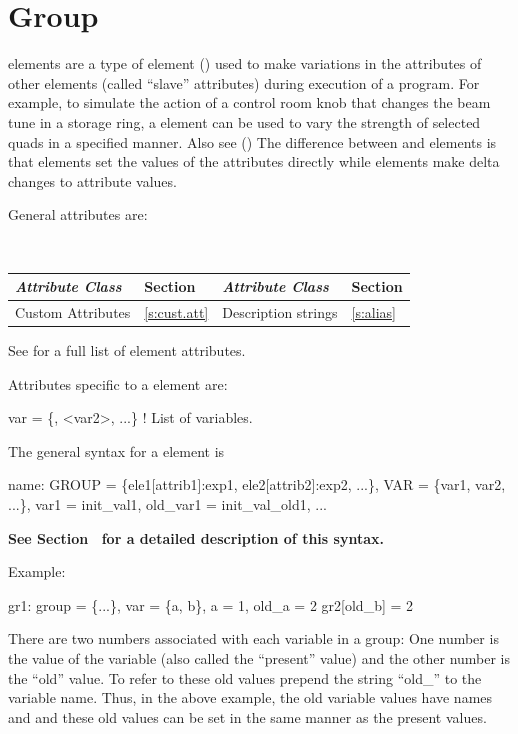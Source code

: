 \section{Group}
\label{s:group}

 elements are a type of  element
() used to make variations in the attributes of
other elements (called ``slave'' attributes) during execution of a
program. For example, to simulate the action of a control room knob
that changes the beam tune in a storage ring, a  element can
be used to vary the strength of selected quads in a specified
manner. Also see  () The difference
between  and  elements is that 
elements set the values of the attributes directly while 
elements make delta changes to attribute values.

General  attributes are:
\begin{center}
\tt
\begin{tabular}{llll} \toprule
  {\sl Attribute Class}      & Section           & {\sl Attribute Class}      & Section         \\ \midrule
  Custom Attributes          & \ref{s:cust.att}  & Description strings        & \ref{s:alias}   \\ 
  \bottomrule
\end{tabular}
\end{center}
\toffset
See  for a full list of element attributes.

Attributes specific to a  element are:
\begin{example}
  var = \{<var1>, <var2>, ...\}   ! List of variables.
\end{example}

The general syntax for a  element is
\begin{example}
  name: GROUP = \{ele1[attrib1]:exp1, ele2[attrib2]:exp2, ...\}, 
              VAR = \{var1, var2, ...\}, var1 = init_val1, old_var1 = init_val_old1, ...
\end{example}
\textbf{See Section~ for a detailed description of this syntax.}

Example:
\begin{example}
  gr1: group = \{...\}, var = \{a, b\}, a = 1, old_a = 2
  gr2[old_b] = 2
\end{example}
There are two numbers associated with each
variable in a group: One number is the value of the variable (also
called the ``present'' value) and the other number is the ``old''
value. To refer to these old values prepend the string ``old_'' to the
variable name. Thus, in the above example, the old variable values
have names  and  and these old values can be set
in the same manner as the present values.

